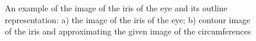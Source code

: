 \begin{figure}[h!]
\caption{An example of the image of the iris of the eye and its outline representation: a) the image of the iris of the eye; b) contour image of the iris and approximating the given image of the circumferences}
\label{intro:fig1}
\end{figure}

